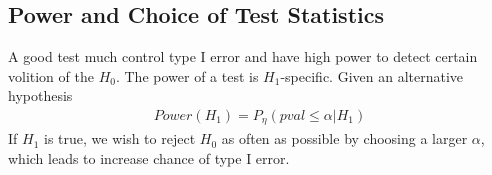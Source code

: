 \documentclass[11pt]{article}
\begin{document}
	\subsection{Power and Choice of Test Statistics}
	\par A good test much control type I error and have high power to detect certain volition of the $H_0$. The power of a test is $H_1$-specific. Given an alternative hypothesis
	\begin{align}
		Power(H_1) = P_\eta(pval \leq \alpha | H_1)
	\end{align}
	If $H_1$ is true, we wish to reject $H_0$ as often as possible by choosing a larger $\alpha$, which leads to increase chance of type I error.
\end{document}
